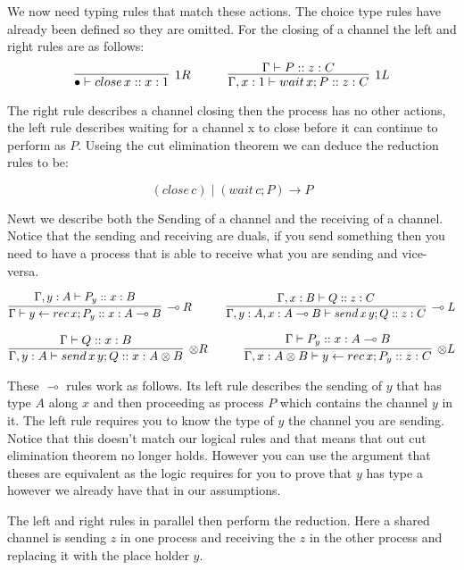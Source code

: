 \documentclass{article}
\begin{document}
We now need typing rules that match these actions. The choice type rules have already been defined so they are omitted. For the closing of a channel the left and right rules are as follows:
\[
\infer[{1R}]
  {\bullet \vdash close \, x :: x : 1}
  {}
\hspace{3em}
\infer[{1L}]
  {\Gamma , x:1 \vdash wait \, x ; P :: z:C }
  {\Gamma \vdash P :: z : C}
\]

The right rule describes a channel closing then the process has no other actions, the left rule describes waiting for a channel x to close before it can continue to perform as \( P \). Useing the cut elimination theorem we can deduce the reduction rules to be:

\[ (close \, c ) \mid ( wait \, c ; P ) \rightarrow P  \]


Newt we describe both the Sending of a channel and the receiving of a channel. Notice that the sending and receiving are duals, if you send something then you need to have a process that is able to receive what you are sending and vice-versa.

\[
\infer[{\multimap R}]
  {\Gamma \vdash y \leftarrow rec \, x ; P_y :: x : A \multimap  B}
  {\Gamma , y:A \vdash P_y :: x: B}
\hspace{3em}
\infer[{\multimap L}]
  {\Gamma , y:A , x: A \multimap B \vdash send \, x \, y ; Q :: z : C}
  {\Gamma , x:B \vdash Q :: z : C}
\]

\[
\infer[{\otimes R}]
  {\Gamma , y:A \vdash send \, x \, y ; Q :: x : A \otimes B}
  {\Gamma \vdash Q :: x : B}
\hspace{3em}
\infer[{\otimes L}]
  {\Gamma , x : A \otimes B \vdash y \leftarrow rec \, x ; P_y :: z : C}
  {\Gamma  \vdash P_y :: x: A \multimap B}
\]
	
These \(\multimap\) rules work as follows. Its left rule describes the sending of \(y\) that has type \(A\) along \(x\) and then proceeding as process \(P\) which contains the channel \(y\) in it. The left rule requires you to know the type of \(y\) the channel you are sending. Notice that this doesn't match our logical rules and that means that out cut elimination theorem no longer holds. However you can use the argument that theses are equivalent as the logic requires for you to prove that \(y\) has type a however we already have that in our assumptions.  %

The left and right rules in parallel then perform the reduction. Here a shared channel is sending \(z\) in one process and receiving the \(z\) in the other process and replacing it with the place holder \(y\).
\end{document}
